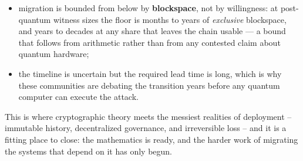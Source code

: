 \begin{itemize}
  \item migration is bounded from below by \textbf{blockspace}, not by willingness: at post-quantum witness sizes the floor is months to years of \emph{exclusive} blockspace, and years to decades at any share that leaves the chain usable --- a bound that follows from arithmetic rather than from any contested claim about quantum hardware;
  \item the timeline is uncertain but the required lead time is long, which is why these communities are debating the transition years before any quantum computer can execute the attack.
\end{itemize}

This is where cryptographic theory meets the messiest realities of deployment -- immutable history, decentralized governance, and irreversible loss -- and it is a fitting place to close: the mathematics is ready, and the harder work of migrating the systems that depend on it has only begun.

\printbibliography[heading=chapterrefs]
